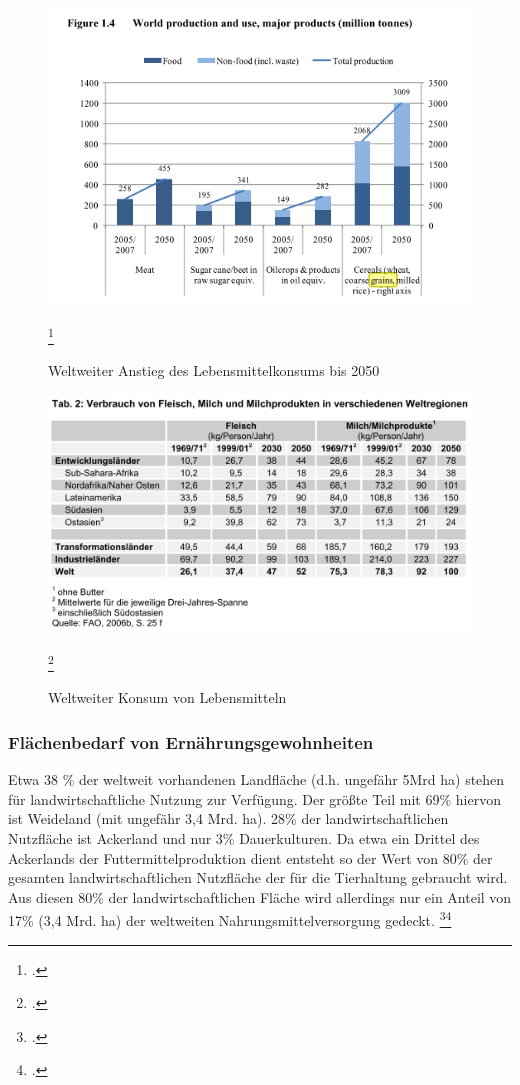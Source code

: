 \documentclass{scrartcl}
\begin{document}
\begin{figure}[htbp]
\centering
\includegraphics[width=16cm]{image_folder/2030S8.png}
\caption{Weltweiter Anstieg des Lebensmittelkonsums bis 2050}
\label{fig:konsumbis2050}\footcite[vgl.][S.8]{FAO2006World2030/2050} 
\end{figure}

\begin{figure}[htbp]
\centering
\includegraphics[width=16cm]{image_folder/KonsumWeltweit.png}
\caption{Weltweiter Konsum von Lebensmitteln}
\label{fig:konsumweltweit}\footcite[S.4f]{VonKoerber2008Globale-trends}
\end{figure}


\subsubsection{Flächenbedarf von Ernährungsgewohnheiten}
Etwa 38 \% der weltweit vorhandenen Landfläche (d.h. ungefähr 5Mrd ha) stehen für landwirtschaftliche Nutzung zur Verfügung. Der größte Teil mit 69\% hiervon ist Weideland (mit ungefähr 3,4 Mrd. ha). 28\% der landwirtschaftlichen Nutzfläche ist Ackerland und nur 3\% Dauerkulturen.
Da etwa ein Drittel des Ackerlands der Futtermittelproduktion dient entsteht so der Wert von 80\% der gesamten landwirtschaftlichen Nutzfläche der für die Tierhaltung gebraucht wird. Aus diesen 80\% der landwirtschaftlichen Fläche wird allerdings nur ein Anteil von 17\% (3,4 Mrd. ha) der weltweiten Nahrungsmittelversorgung gedeckt. \footcite{2008FAOSTAT}\footcite[Vgl.][S.6]{VonKoerber2008Globale-trends}
\end{document}
